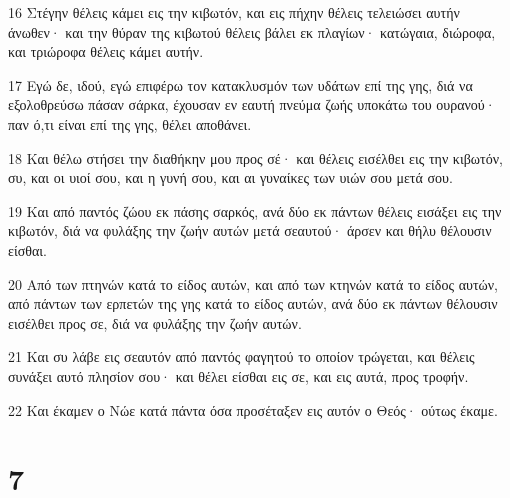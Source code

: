 \par 16 Στέγην θέλεις κάμει εις την κιβωτόν, και εις πήχην θέλεις τελειώσει αυτήν άνωθεν· και την θύραν της κιβωτού θέλεις βάλει εκ πλαγίων· κατώγαια, διώροφα, και τριώροφα θέλεις κάμει αυτήν.
\par 17 Εγώ δε, ιδού, εγώ επιφέρω τον κατακλυσμόν των υδάτων επί της γης, διά να εξολοθρεύσω πάσαν σάρκα, έχουσαν εν εαυτή πνεύμα ζωής υποκάτω του ουρανού· παν ό,τι είναι επί της γης, θέλει αποθάνει.
\par 18 Και θέλω στήσει την διαθήκην μου προς σέ· και θέλεις εισέλθει εις την κιβωτόν, συ, και οι υιοί σου, και η γυνή σου, και αι γυναίκες των υιών σου μετά σου.
\par 19 Και από παντός ζώου εκ πάσης σαρκός, ανά δύο εκ πάντων θέλεις εισάξει εις την κιβωτόν, διά να φυλάξης την ζωήν αυτών μετά σεαυτού· άρσεν και θήλυ θέλουσιν είσθαι.
\par 20 Από των πτηνών κατά το είδος αυτών, και από των κτηνών κατά το είδος αυτών, από πάντων των ερπετών της γης κατά το είδος αυτών, ανά δύο εκ πάντων θέλουσιν εισέλθει προς σε, διά να φυλάξης την ζωήν αυτών.
\par 21 Και συ λάβε εις σεαυτόν από παντός φαγητού το οποίον τρώγεται, και θέλεις συνάξει αυτό πλησίον σου· και θέλει είσθαι εις σε, και εις αυτά, προς τροφήν.
\par 22 Και έκαμεν ο Νώε κατά πάντα όσα προσέταξεν εις αυτόν ο Θεός· ούτως έκαμε.

\chapter{7}

